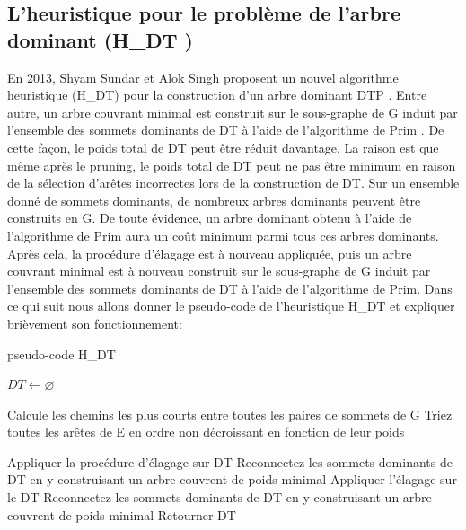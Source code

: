 \subsection{L’heuristique pour le problème de l’arbre dominant (H\_DT )}
En  2013, Shyam Sundar et Alok Singh proposent un nouvel algorithme heuristique (H\_DT) pour la construction d’un arbre dominant DTP \cite{sundar2013new}. Entre autre, un arbre couvrant minimal est construit sur le sous-graphe de G induit par l’ensemble des sommets dominants de DT à l’aide de l’algorithme de Prim \cite{prim1957shortest}. De cette façon, le poids total de DT peut être réduit davantage. La raison  est que même après le pruning, le poids total de DT peut ne pas être minimum en raison de la sélection d'arêtes incorrectes lors de la construction de DT. Sur un ensemble donné de sommets dominants, de nombreux arbres dominants peuvent être construits en G. De toute évidence, un arbre dominant obtenu à l’aide de l’algorithme de Prim aura un coût minimum parmi tous ces arbres dominants. Après cela, la procédure d’élagage est à nouveau appliquée, puis un arbre couvrant minimal est à nouveau construit sur le sous-graphe de G induit par l’ensemble des sommets dominants de DT à l’aide de l’algorithme de Prim. Dans ce qui suit nous allons donner le pseudo-code de l’heuristique H\_DT et expliquer brièvement son fonctionnement:\\

\begin{algorithm}[H]
\label{alg3:HDT}
\caption{ pseudo-code H\_DT}
\SetAlgoLined
\DontPrintSemicolon
\large


$DT \gets \varnothing $  \;


Calcule les chemins les plus courts entre toutes les paires de sommets de G \;
Triez toutes les arêtes de E en ordre non décroissant en fonction de leur poids \;


Appliquer la procédure d'élagage sur DT \;
Reconnectez les sommets dominants de DT en y construisant un arbre couvrent de poids minimal \;
Appliquer l'élagage sur le DT \; 
Reconnectez les sommets dominants de DT en y construisant un arbre couvrent de poids minimal \;
Retourner DT \;
\end{algorithm}

